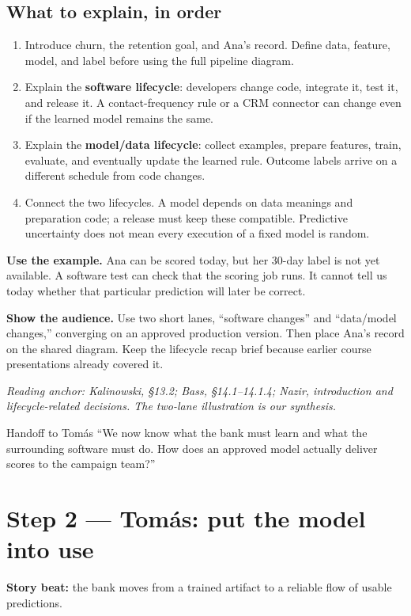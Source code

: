 \documentclass[12pt,a4paper]{article}
\newcommand{\source}[1]{\par\textcolor{teal!70!black}{\textit{Reading anchor: #1}}\par}
\begin{document}
\subsection{What to explain, in order}
\begin{enumerate}
\item Introduce churn, the retention goal, and Ana's record. Define data, feature, model, and label before using the full pipeline diagram.
\item Explain the \textbf{software lifecycle}: developers change code, integrate it, test it, and release it. A contact-frequency rule or a CRM connector can change even if the learned model remains the same.
\item Explain the \textbf{model/data lifecycle}: collect examples, prepare features, train, evaluate, and eventually update the learned rule. Outcome labels arrive on a different schedule from code changes.
\item Connect the two lifecycles. A model depends on data meanings and preparation code; a release must keep these compatible. Predictive uncertainty does not mean every execution of a fixed model is random.
\end{enumerate}

\textbf{Use the example.} Ana can be scored today, but her 30-day label is not yet available. A software test can check that the scoring job runs. It cannot tell us today whether that particular prediction will later be correct.

\textbf{Show the audience.} Use two short lanes, ``software changes'' and ``data/model changes,'' converging on an approved production version. Then place Ana's record on the shared diagram. Keep the lifecycle recap brief because earlier course presentations already covered it.

\source{Kalinowski, \S13.2; Bass, \S14.1--14.1.4; Nazir, introduction and lifecycle-related decisions. The two-lane illustration is our synthesis.}

\begin{handoffbox}{Handoff to Tomás}
``We now know what the bank must learn and what the surrounding software must do. How does an approved model actually deliver scores to the campaign team?''
\end{handoffbox}

\section{Step 2 --- Tomás: put the model into use}
\textbf{Story beat:} the bank moves from a trained artifact to a reliable flow of usable predictions.
\end{document}
